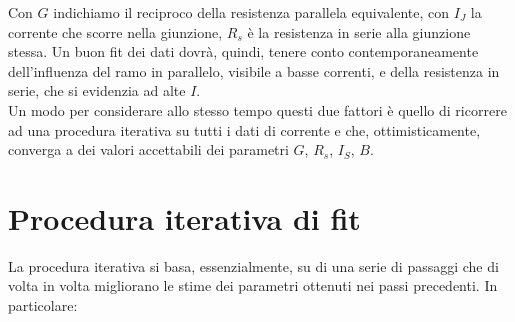 \documentclass[a4paper]{article}
\begin{document}
Con $G$ indichiamo il reciproco della resistenza parallela equivalente, con $I_J$ la corrente che scorre nella giunzione, $R_s$ è la resistenza in serie alla giunzione stessa. Un buon fit dei dati dovrà, quindi, tenere conto contemporaneamente dell'influenza del ramo in parallelo, visibile a basse correnti, e della resistenza in serie, che si evidenzia ad alte $I$.\\

Un modo per considerare allo stesso tempo questi due fattori è quello di ricorrere ad una procedura iterativa su tutti i dati di corrente e che, ottimisticamente, converga a dei valori accettabili dei parametri $G$, $R_s$, $I_S$, $B$.

\section{Procedura iterativa di fit}
La procedura iterativa si basa, essenzialmente, su di una serie di passaggi che di volta in volta migliorano le stime dei parametri ottenuti nei passi precedenti. In particolare:
\end{document}
